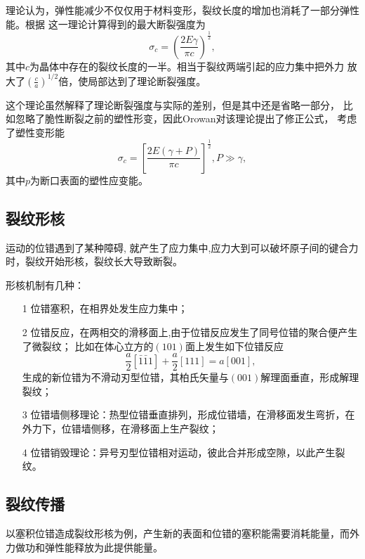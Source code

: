             理论认为，弹性能减少不仅仅用于材料变形，裂纹长度的增加也消耗了一部分弹性能。根据
            这一理论计算得到的最大断裂强度为
            \begin{equation}
                \sigma_c=\left( \frac{2E\gamma}{\pi c} \right)^{\frac{1}{2}}\label{Griffth脆断},
            \end{equation}
            其中$c$为晶体中存在的裂纹长度的一半。相当于裂纹两端引起的应力集中把外力
            放大了$\left( \frac{c}{a} \right)^{1/2}$倍，使局部达到了理论断裂强度。
        
            这个理论虽然解释了理论断裂强度与实际的差别，但是其中还是省略一部分，
            比如忽略了脆性断裂之前的塑性形变，因此Orowan对该理论提出了修正公式，
            考虑了塑性变形能
            \begin{equation}
                \sigma_c=\left[ \frac{2E(\gamma+P)}{\pi c} \right]^{\frac{1}{2}},P\gg\gamma,
            \end{equation}
            其中$p$为断口表面的塑性应变能。
        \subsection{裂纹形核}
            运动的位错遇到了某种障碍, 就产生了应力集中,应力大到可以破坏原子间的键合力时，裂纹开始形核，裂纹长大导致断裂。
            
            形核机制有几种：
            \begin{itemize}
                \item[1] 位错塞积，在相界处发生应力集中；
                \item[2] 位错反应，在两相交的滑移面上,由于位错反应发生了同号位错的聚合便产生了微裂纹；
                            比如在体心立方的$(101)$面上发生如下位错反应
                            \begin{equation}
                                \frac{a}{2}[\bar{1}\bar{1}1]+\frac{a}{2}[111]=a[001],
                            \end{equation} 
                            生成的新位错为不滑动刃型位错，其柏氏矢量与$(001)$解理面垂直，形成解理裂纹；
                \item[3] 位错墙侧移理论：热型位错垂直排列，形成位错墙，在滑移面发生弯折，在外力下，位错墙侧移，在滑移面上生产裂纹；
                \item[4] 位错销毁理论：异号刃型位错相对运动，彼此合并形成空隙，以此产生裂纹。
            \end{itemize}
        \subsection{裂纹传播}
            以塞积位错造成裂纹形核为例，产生新的表面和位错的塞积能需要消耗能量，而外力做功和弹性能释放为此提供能量。

